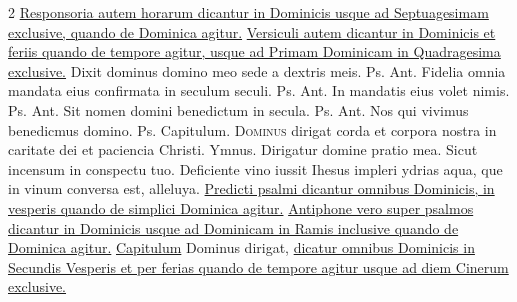 \begin{multicols*}{2}
\newline \ul{Responsoria autem horarum dicantur in Dominicis usque ad Septuagesimam exclusive, quando de Dominica agitur.}
\newline \ul{Versiculi autem dicantur in Dominicis et feriis quando de tempore agitur, usque ad Primam Dominicam in Quadragesima exclusive.}
 Dixit dominus domino meo sede a dextris meis. {\color{Red} Ps.}  {\color{Red} Ant.} Fidelia omnia mandata eius confirmata in seculum seculi. {\color{Red} Ps.}  {\color{Red} Ant.} In mandatis eius volet nimis. {\color{Red} Ps.}  {\color{Red} Ant.} Sit nomen domini benedictum in secula. {\color{Red} Ps.}  {\color{Red} Ant.} Nos qui vivimus benedicmus domino. {\color{Red} Ps.}  {\color{Red} Capitulum.}
\lettrine[lines=2]{\zallmancaps \color{Red} D}{ominus} dirigat corda et corpora nostra in caritate dei et paciencia Christi. {\color{Red} Ymnus.}
\newline \V Dirigatur domine pratio mea.
\newline \R Sicut incensum in conspectu tuo.
 Deficiente vino iussit Ihesus impleri ydrias aqua, que in vinum conversa est, alleluya.
\newline \ul{Predicti psalmi dicantur omnibus Dominicis, in vesperis quando de simplici Dominica agitur.}
\newline \ul{Antiphone vero super psalmos dicantur in Dominicis usque ad Dominicam in Ramis inclusive quando de Dominica agitur.}
\newline \ul{Capitulum} Dominus dirigat, \ul{dicatur omnibus Dominicis in Secundis Vesperis et per ferias quando de tempore agitur usque ad diem Cinerum exclusive.}

\end{multicols*}
